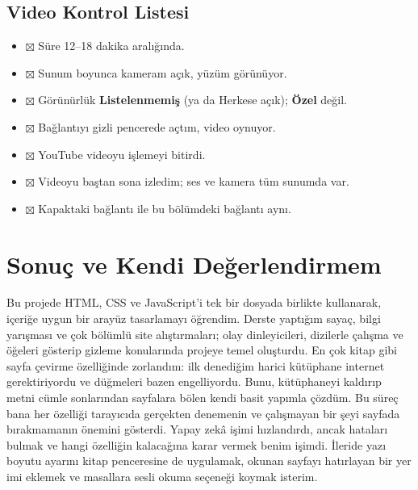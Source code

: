 \documentclass[12pt,a4paper]{article}
\begin{document}
\subsection{Video Kontrol Listesi}
\begin{itemize}[label={}]
  \item $\boxtimes$ Süre 12--18 dakika aralığında.
  \item $\boxtimes$ Sunum boyunca kameram açık, yüzüm görünüyor.
  \item $\boxtimes$ Görünürlük \textbf{Listelenmemiş} (ya da Herkese açık); \textbf{Özel} değil.
  \item $\boxtimes$ Bağlantıyı gizli pencerede açtım, video oynuyor.
  \item $\boxtimes$ YouTube videoyu işlemeyi bitirdi.
  \item $\boxtimes$ Videoyu baştan sona izledim; ses ve kamera tüm sunumda var.
  \item $\boxtimes$ Kapaktaki bağlantı ile bu bölümdeki bağlantı aynı.
\end{itemize}

\section{Sonuç ve Kendi Değerlendirmem}
Bu projede HTML, CSS ve JavaScript'i tek bir dosyada birlikte kullanarak, içeriğe uygun bir
arayüz tasarlamayı öğrendim. Derste yaptığım sayaç, bilgi yarışması ve çok bölümlü site
alıştırmaları; olay dinleyicileri, dizilerle çalışma ve öğeleri gösterip gizleme konularında
projeye temel oluşturdu. En çok kitap gibi sayfa çevirme özelliğinde zorlandım: ilk denediğim
harici kütüphane internet gerektiriyordu ve düğmeleri bazen engelliyordu. Bunu, kütüphaneyi
kaldırıp metni cümle sonlarından sayfalara bölen kendi basit yapımla çözdüm. Bu süreç bana
her özelliği tarayıcıda gerçekten denemenin ve çalışmayan bir şeyi sayfada bırakmamanın
önemini gösterdi. Yapay zekâ işimi hızlandırdı, ancak hataları bulmak ve hangi özelliğin
kalacağına karar vermek benim işimdi. İleride yazı boyutu ayarını kitap penceresine de uygulamak, okunan sayfayı hatırlayan bir
yer imi eklemek ve masallara sesli okuma seçeneği koymak isterim.

\end{document}
